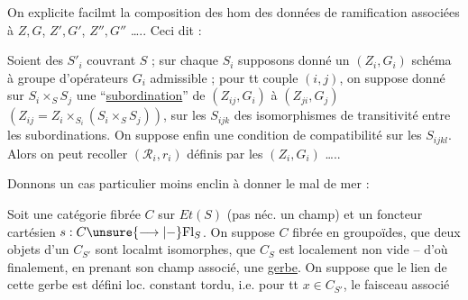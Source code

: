 On explicite facilmt la composition des hom des données de ramification associées à $Z,G$, $Z',G'$, $Z'',G''$ \ldots.. Ceci dit :

Soient des $S'_i$ couvrant $S$ ; sur chaque $S_i$ supposons donné un $(Z_i,G_i)$ schéma à groupe d'opérateurs $G_i$ admissible ; pour tt couple $(i,j)$, on suppose donné  sur $S_i\times_S S_j$ une ``\uline{subordination}'' de $(Z_{ij},G_i)$ à $(Z_{ji},G_j)$ $(Z_{ij}=Z_i\times_{S_i}(S_i\times_S S_j))$,  sur les $S_{ijk}$ des isomorphismes de transitivité entre les subordinations. On suppose enfin une condition de compatibilité sur les $S_{ijkl}$. Alors on peut recoller  $(\mathscr R_i,r_i)$ définis par les $(Z_i,G_i)$ \ldots..

Donnons un cas particulier moins enclin à donner le mal de mer :

Soit une catégorie fibrée  $C$ sur $Et(S)$ (pas néc. un champ) et un foncteur cartésien $s:C\unsure{\longrightarrow|-}\mathrm{Fl}_S$. On suppose $C$ fibrée en groupoïdes, que deux objets d'un $C_{S'}$ sont localmt isomorphes, que $C_S$ est localement non vide -- d'où finalement, en prenant son champ associé, une \uline{gerbe}. On suppose que le lien de cette gerbe est défini  loc. constant tordu, i.e. pour tt $x\in C_{S'}$, le faisceau associé
